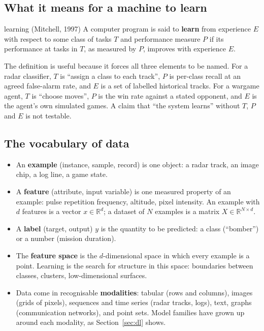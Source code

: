\documentclass[11pt]{article}
\begin{document}
\subsection{What it means for a machine to learn}
\begin{definition}{learning (Mitchell, 1997)}
A computer program is said to \textbf{learn} from experience $E$ with respect to some class of tasks $T$ and performance measure $P$ if its performance at tasks in $T$, as measured by $P$, improves with experience $E$.
\end{definition}
The definition is useful because it forces all three elements to be named. For a radar classifier, $T$ is ``assign a class to each track'', $P$ is per-class recall at an agreed false-alarm rate, and $E$ is a set of labelled historical tracks. For a wargame agent, $T$ is ``choose moves'', $P$ is the win rate against a stated opponent, and $E$ is the agent's own simulated games. A claim that ``the system learns'' without $T$, $P$ and $E$ is not testable.

\subsection{The vocabulary of data}
\begin{itemize}
\item An \textbf{example} (instance, sample, record) is one object: a radar track, an image chip, a log line, a game state.
\item A \textbf{feature} (attribute, input variable) is one measured property of an example: pulse repetition frequency, altitude, pixel intensity. An example with $d$ features is a vector $x\in\mathbb R^d$; a dataset of $N$ examples is a matrix $X\in\mathbb R^{N\times d}$.
\item A \textbf{label} (target, output) $y$ is the quantity to be predicted: a class (``bomber'') or a number (mission duration).
\item The \textbf{feature space} is the $d$-dimensional space in which every example is a point. Learning is the search for structure in this space: boundaries between classes, clusters, low-dimensional surfaces.
\item Data come in recognisable \textbf{modalities}: tabular (rows and columns), images (grids of pixels), sequences and time series (radar tracks, logs), text, graphs (communication networks), and point sets. Model families have grown up around each modality, as Section~\ref{sec:dl} shows.
\end{itemize}
\end{document}
